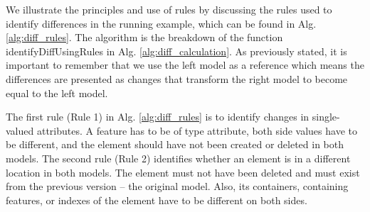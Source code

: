 \documentclass{jot}
\begin{document}
    We illustrate the principles and use of rules by discussing the rules used to identify differences in the running example, which can be found in Alg. \ref{alg:diff_rules}. The algorithm is the breakdown of the function \textsf{identifyDiffUsingRules} in Alg. \ref{alg:diff_calculation}. As previously stated, it is important to remember that we use the left model as a reference which means the differences are presented as changes that transform the right model to become equal to the left model. 
    
    The first rule (Rule 1) in Alg. \ref{alg:diff_rules} is to identify changes in single-valued attributes. A feature has to be of type \textsf{attribute}, both side values have to be different, and the element should have not been created or deleted in both models. The second rule (Rule 2) identifies whether an element is in a different location in both models. The element must not have been deleted and must exist from the previous version -- the original model. Also, its containers, containing features, or indexes of the element have to be different on both sides.
    
\end{document}
